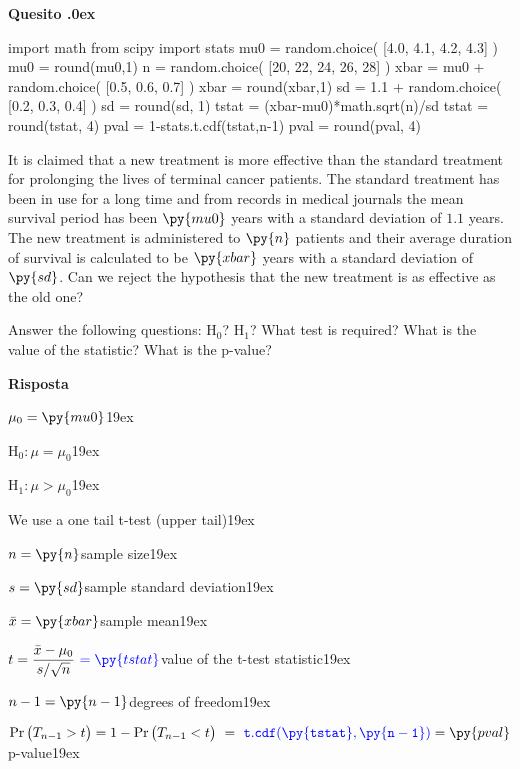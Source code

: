 \documentclass[11pt,twoside,a4paper]{article}
\newcounter{quesito}
\newenvironment{question}{\bigskip\addtocounter{quesito}{1}\bigskip\bigskip\par\textbf{Quesito \thequesito.\kern0ex}}{\par\vspace{\parskip}}
\newenvironment{answer}{\par\textbf{Risposta\quad}}{\par\vspace{\parskip}}
\begin{document}
\begin{question}
\begin{pycode}
import math
from scipy import stats
mu0 = random.choice( [4.0, 4.1, 4.2, 4.3] )
mu0 = round(mu0,1)
n = random.choice( [20, 22, 24, 26, 28] )
xbar = mu0 + random.choice( [0.5, 0.6, 0.7] )
xbar = round(xbar,1)
sd = 1.1 + random.choice( [0.2, 0.3, 0.4] )
sd = round(sd, 1)
tstat = (xbar-mu0)*math.sqrt(n)/sd
tstat = round(tstat, 4)
pval = 1-stats.t.cdf(tstat,n-1)
pval = round(pval, 4)
\end{pycode}
It is claimed that a new treatment is more effective than the standard treatment for prolonging the lives of terminal cancer patients. The standard treatment has been in use for a long time and from records in medical journals the mean survival period has been $\py{mu0}$ years with a standard deviation of $1.1$ years. The new treatment is administered to $\py{n}$ patients and their average duration of survival is calculated to be $\py{xbar}$ years with a standard deviation of $\py{sd}$. Can we reject the hypothesis that the new treatment is as effective as the old one? 

Answer the following questions: H$_0$? H$_1$? What test is required? What is the value of the statistic? What is the p-value? 

\begin{answer}\parskip5pt

  $\mu_0 = \py{mu0}$\kern19ex

  {\color{blue}H$_0:$\hfill $\mu = \mu_0$}\kern19ex
  
  {\color{blue}H$_1:$\hfill $\mu>\mu_0$}\kern19ex
  
  {\color{blue}We use a one tail t-test (upper tail)}\kern19ex
  
  $n = \py{n}$\hfill sample size\kern19ex
  
  $s = \py{sd}$\hfill sample standard deviation\kern19ex
  
  $\bar{x} = \py{xbar}$\hfill sample mean\kern19ex
  
  $t = \displaystyle\frac{\bar{x}-\mu_0}{s/\sqrt{n}}\ {\color{blue}= \py{tstat}}$\hfill value of the t-test statistic\kern19ex
  
  $n-1 = \py{n-1}$\hfill degrees of freedom\kern19ex
  
  $\Pr\big(T_{n-1}>t\big) = 1- \Pr\big(T_{n-1}<t\big)\ =\ {\color{blue}\tt t.cdf(\py{tstat}, \py{n-1})}= \py{pval}$\hfill p-value\kern19ex

\end{answer}
\end{question}
\end{document}
